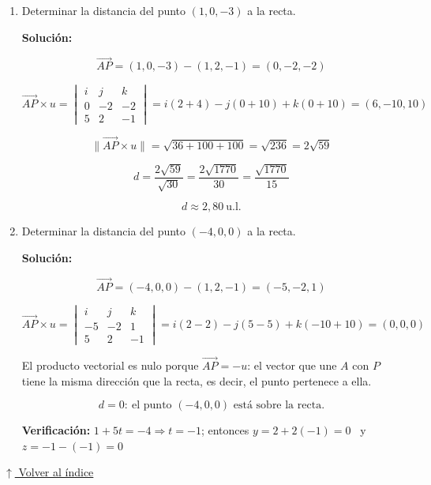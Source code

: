 \documentclass[12pt]{article}
\newcommand{\solucion}{%
    \vspace{0.8em}%
    \textbf{Solución:}%
    \vspace{0.8em}%
}
\newcommand{\volverindice}{%
    \vspace{1em}%
    \begin{flushright}%
        \hyperlink{indice}{\small $\uparrow$ Volver al índice}%
    \end{flushright}%
}
\begin{document}
\begin{enumerate}[label=\alph*.-]

    \item Determinar la distancia del punto $(1,0,-3)$ a la recta.

    \solucion

    \[
    \overrightarrow{AP}=(1,0,-3)-(1,2,-1)=(0,-2,-2)
    \]

    \[
    \overrightarrow{AP}\times u=\begin{vmatrix}
    i & j & k\\
    0 & -2 & -2\\
    5 & 2 & -1
    \end{vmatrix}
    =i(2+4)-j(0+10)+k(0+10)=(6,-10,10)
    \]

    \[
    \big\|\overrightarrow{AP}\times u\big\|=\sqrt{36+100+100}=\sqrt{236}
    =2\sqrt{59}
    \]

    \[
    d=\frac{2\sqrt{59}}{\sqrt{30}}=\frac{2\sqrt{1770}}{30}
    =\frac{\sqrt{1770}}{15}
    \]

    \[
    \boxed{d\approx2{,}80\ \text{u.l.}}
    \]

    \item Determinar la distancia del punto $(-4,0,0)$ a la recta.

    \solucion

    \[
    \overrightarrow{AP}=(-4,0,0)-(1,2,-1)=(-5,-2,1)
    \]

    \[
    \overrightarrow{AP}\times u=\begin{vmatrix}
    i & j & k\\
    -5 & -2 & 1\\
    5 & 2 & -1
    \end{vmatrix}
    =i(2-2)-j(5-5)+k(-10+10)=(0,0,0)
    \]

    El producto vectorial es nulo porque $\overrightarrow{AP}=-u$: el vector
    que une $A$ con $P$ tiene la misma dirección que la recta, es decir, el
    punto pertenece a ella.

    \[
    \boxed{d=0:\ \text{el punto } (-4,0,0) \text{ está sobre la recta.}}
    \]

    \textbf{Verificación:} $1+5t=-4\Rightarrow t=-1$; entonces
    $y=2+2(-1)=0$ \checkmark\ y $z=-1-(-1)=0$ \checkmark

\end{enumerate}

\volverindice
\newpage

\end{document}

